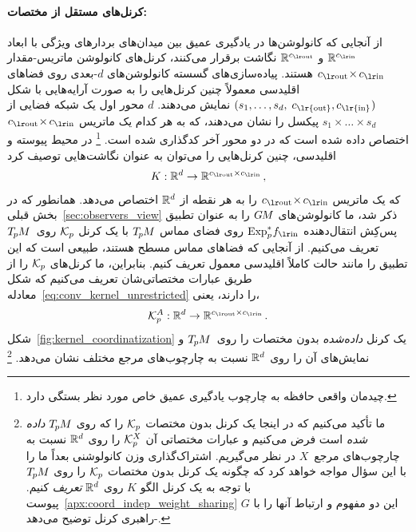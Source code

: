 \paragraph{کرنل‌های مستقل از مختصات:}
از آنجایی که کانولوشن‌ها در یادگیری عمیق بین میدان‌های بردارهای ویژگی با ابعاد $\R^\cin$ و $\R^\cout$ نگاشت برقرار می‌کنند، کرنل‌های کانولوشن ماتریس-مقدار 
${\cout \mkern-3mu\times\mkern-1.5mu \cin}$ هستند.
پیاده‌سازی‌های گسسته کانولوشن‌های $d$-بعدی روی فضاهای اقلیدسی معمولاً چنین کرنل‌هایی را به صورت آرایه‌هایی با شکل $(s_1,\dots,s_d, \; c_\text{\lr{out}},c_\text{\lr{in}} \mkern1mu)$ نمایش می‌دهند.
$d$ محور اول یک شبکه فضایی از $s_1 \times\dots\times s_d$ پیکسل را نشان می‌دهند، که به هر کدام یک ماتریس ${\cout \mkern-3mu\times\mkern-1.5mu \cin}$ اختصاص داده شده است که در دو محور آخر کدگذاری شده است.%
\footnote{
	چیدمان واقعی حافظه به چارچوب یادگیری عمیق خاص مورد نظر بستگی دارد.
}
در محیط پیوسته و اقلیدسی، چنین کرنل‌هایی را می‌توان به عنوان نگاشت‌هایی توصیف کرد
\begin{align}\label{eq:conv_kernel_unrestricted}
	K: \R^d \to \R^{\cout\times\cin} \,,
\end{align}
که یک ماتریس ${\cout \mkern-3mu\times\mkern-1.5mu \cin}$ را به هر نقطه از $\mathbb{R}^d$ اختصاص می‌دهد.
همانطور که در بخش قبلی~\ref{sec:observers_view} ذکر شد، ما کانولوشن‌های $G\mkern-1.4muM$ را به عنوان تطبیق پس‌کِش انتقال‌دهنده $\Expspfin$
روی فضای مماس $T_{\mkern-1.5mu p}\mkern-.5muM$ با یک کرنل $\mathcal{K}_p$ روی~$T_{\mkern-1.5mu p}\mkern-.5muM$ تعریف می‌کنیم.
از آنجایی که فضاهای مماس مسطح هستند، طبیعی است که این تطبیق را مانند حالت کاملاً اقلیدسی معمول تعریف کنیم.
بنابراین، ما کرنل‌های $\mathcal{K}_p$ را از طریق عبارات مختصاتی‌شان تعریف می‌کنیم که شکل معادله~\eqref{eq:conv_kernel_unrestricted} را دارند، یعنی،
\begin{align}
	\Kp^A: \R^d \to \R^{\cout\times\cin} \,.
\end{align}
شکل~\ref{fig:kernel_coordinatization} یک کرنل \emph{داده‌شده} بدون مختصات را روی~$T_{\mkern-1.5mu p}\mkern-.5muM$ و نمایش‌های آن را روی $\mathbb{R}^d$ نسبت به چارچوب‌های مرجع مختلف نشان می‌دهد.%
\footnote{
	ما تأکید می‌کنیم که در اینجا یک کرنل بدون مختصات $\mathcal{K}_p$ را که روی $T_{\mkern-1.5mu p}\mkern-.5muM$ \emph{داده شده} است فرض می‌کنیم و عبارات مختصاتی آن $\mathcal{K}_p^X$ را روی $\mathbb{R}^d$ نسبت به چارچوب‌های مرجع~$X$ در نظر می‌گیریم.
	اشتراک‌گذاری وزن کانولوشنی بعداً ما را با این سؤال مواجه خواهد کرد که چگونه یک کرنل بدون مختصات $\mathcal{K}_p$ را روی $T_{\mkern-1.5mu p}\mkern-.5muM$ با توجه به یک کرنل الگو $K$ روی $\mathbb{R}^d$ \emph{تعریف} کنیم.
	پیوست~\ref{apx:coord_indep_weight_sharing} این دو مفهوم و ارتباط آنها را با $G$-راهبری کرنل توضیح می‌دهد.
}

